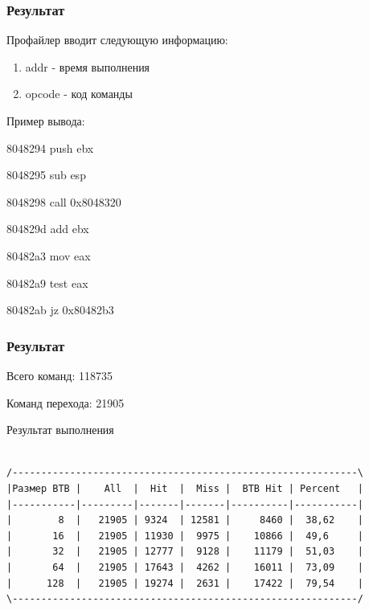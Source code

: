 \documentclass{beamer}
\begin{document}
\begin{frame}
\frametitle{Результат}

Профайлер вводит следующую информацию: 

\begin{enumerate}
\item addr - время выполнения
\item opcode	- код команды

\end{enumerate}


\begin{block}{Пример вывода:}

8048294	push ebx

8048295	sub esp

8048298	call 0x8048320

804829d	add ebx

80482a3	mov eax

80482a9	test eax

80482ab	jz 0x80482b3

\end{block}


\end{frame}

\begin{frame}[fragile]
\frametitle{Результат}

Всего команд: 118735

Команд перехода: 21905

\begin{block}{Результат выполнения}
\begin{verbatim}

/------------------------------------------------------------\
|Размер BTB |    All  |  Hit  |  Miss |  BTB Hit | Percent   |
|-----------|---------|-------|-------|----------|-----------|
|        8  |   21905 | 9324  | 12581 |     8460 |  38,62    |
|       16  |   21905 | 11930 |  9975 |    10866 |  49,6     |
|       32  |   21905 | 12777 |  9128 |    11179 |  51,03    |
|       64  |   21905 | 17643 |  4262 |    16011 |  73,09    |
|      128  |   21905 | 19274 |  2631 |    17422 |  79,54    |
\------------------------------------------------------------/

\end{verbatim}
\end{block}
\end{frame}

\end{document}
